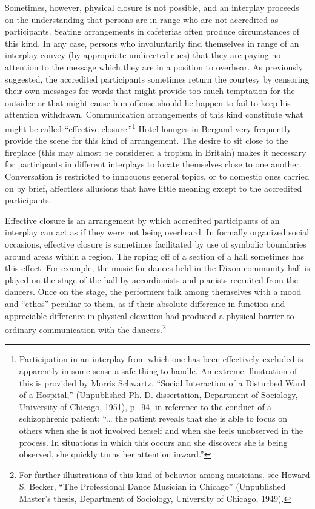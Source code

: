 \documentclass[openany,nobib]{tufte-book}
\begin{document}
Sometimes, however, physical closure is not possible, and an interplay
proceeds on the understanding that persons are in range who are not
accredited as participants. Seating arrangements in cafeterias often
produce circumstances of this kind. In any case, persons who
involuntarily find themselves in range of an interplay convey (by
appropriate undirected cues) that they are paying no attention to the
message which they are in a position to overhear. As previously
suggested, the accredited participants sometimes return the courtesy by
censoring their own messages for words that might provide too much
temptation for the outsider or that might cause him offense should he
happen to fail to keep his attention withdrawn. Communication
arrangements of this kind constitute what might be called ``effective
closure.''\footnote{Participation in an interplay from which one has
  been effectively excluded is apparently in some sense a safe thing to
  handle. An extreme illustration of this is provided by Morris
  Schwartz, ``Social Interaction of a Disturbed Ward of a Hospital,''
  (Unpublished Ph. D. dissertation, Department of Sociology, University
  of Chicago, 1951), p.~94, in reference to the conduct of a
  schizophrenic patient: ``\ldots{} the patient reveals that she is able
  to focus on others when she is not involved herself and when she feels
  unobserved in the process. In situations in which this occurs and she
  discovers she is being observed, she quickly turns her attention
  inward.''} Hotel lounges in Bergand very frequently provide the scene
for this kind of arrangement. The desire to sit close to the fireplace
(this may almost be considered a tropism in Britain) makes it necessary
for participants in different interplays to locate themselves close to
one another. Conversation is restricted to innocuous general topics, or
to domestic ones carried on by brief, affectless allusions that have
little meaning except to the accredited participants.

Effective closure is an arrangement by which accredited participants of
an interplay can act as if they were not being overheard. In formally
organized social occasions, effective closure is sometimes facilitated
by use of symbolic boundaries around areas within a region. The roping
off of a section of a hall sometimes has this effect. For example, the
music for dances held in the Dixon community hall is played on the stage
of the hall by accordionists and pianists recruited from the dancers.
Once on the stage, the performers talk among themselves with a mood and
``ethos'' peculiar to them, as if their absolute difference in function
and appreciable difference in physical elevation had produced a physical
barrier to ordinary communication with the dancers.\footnote{For
  further illustrations of this kind of behavior among musicians, see
  Howard S. Becker, ``The Professional Dance Musician in Chicago''
  (Unpublished Master's thesis, Department of Sociology, University of
  Chicago, 1949).}
\end{document}
